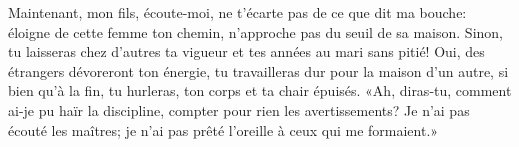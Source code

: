 Maintenant, mon fils, écoute-moi, ne t’écarte pas de ce que dit ma bouche:
	éloigne de cette femme ton chemin, n’approche pas du seuil de sa maison.
Sinon, tu laisseras chez d’autres ta vigueur
	et tes années au mari sans pitié!
Oui, des étrangers dévoreront ton énergie,
	tu travailleras dur pour la maison d’un autre,
	si bien qu’à la fin, tu hurleras, ton corps et ta chair épuisés.
«Ah, diras-tu, comment ai-je pu haïr la discipline,
	compter pour rien les avertissements?
Je n’ai pas écouté les maîtres;
	je n’ai pas prêté l’oreille à ceux qui me formaient.»
